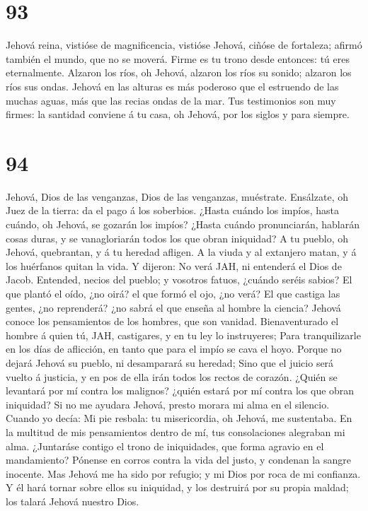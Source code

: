 \hypertarget{section-92}{%
\section{93}\label{section-92}}

 Jehová reina, vistióse de magnificencia, vistióse Jehová,
ciñóse de fortaleza; afirmó también el mundo, que no se moverá.
 Firme es tu trono desde entonces: tú eres eternalmente.
 Alzaron los ríos, oh Jehová, alzaron los ríos su sonido;
alzaron los ríos sus ondas.  Jehová en las alturas es más
poderoso que el estruendo de las muchas aguas, más que las recias ondas
de la mar.  Tus testimonios son muy firmes: la santidad
conviene á tu casa, oh Jehová, por los siglos y para siempre.

\hypertarget{section-93}{%
\section{94}\label{section-93}}

 Jehová, Dios de las venganzas, Dios de las venganzas,
muéstrate.  Ensálzate, oh Juez de la tierra: da el pago á
los soberbios.  ¿Hasta cuándo los impíos, hasta cuándo, oh
Jehová, se gozarán los impíos?  ¿Hasta cuándo
pronunciarán, hablarán cosas duras, y se vanagloriarán todos los que
obran iniquidad?  A tu pueblo, oh Jehová, quebrantan, y á
tu heredad afligen.  A la viuda y al extanjero matan, y á
los huérfanos quitan la vida.  Y dijeron: No verá JAH, ni
entenderá el Dios de Jacob.  Entended, necios del pueblo;
y vosotros fatuos, ¿cuándo seréis sabios?  El que plantó
el oído, ¿no oirá? el que formó el ojo, ¿no verá?  El que
castiga las gentes, ¿no reprenderá? ¿no sabrá el que enseña al hombre la
ciencia?  Jehová conoce los pensamientos de los hombres,
que son vanidad.  Bienaventurado el hombre á quien tú,
JAH, castigares, y en tu ley lo instruyeres;  Para
tranquilizarle en los días de aflicción, en tanto que para el impío se
cava el hoyo.  Porque no dejará Jehová su pueblo, ni
desamparará su heredad;  Sino que el juicio será vuelto á
justicia, y en pos de ella irán todos los rectos de corazón.
 ¿Quién se levantará por mí contra los malignos? ¿quién
estará por mí contra los que obran iniquidad?  Si no me
ayudara Jehová, presto morara mi alma en el silencio. 
Cuando yo decía: Mi pie resbala: tu misericordia, oh Jehová, me
sustentaba.  En la multitud de mis pensamientos dentro de
mí, tus consolaciones alegraban mi alma.  ¿Juntaráse
contigo el trono de iniquidades, que forma agravio en el mandamiento?
 Pónense en corros contra la vida del justo, y condenan
la sangre inocente.  Mas Jehová me ha sido por refugio; y
mi Dios por roca de mi confianza.  Y él hará tornar sobre
ellos su iniquidad, y los destruirá por su propia maldad; los talará
Jehová nuestro Dios.


